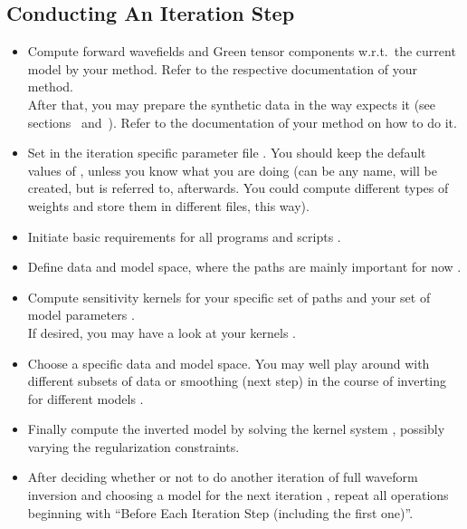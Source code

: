 \subsection*{Conducting An Iteration Step}
%
\begin{itemize}
\item Compute forward wavefields and Green tensor components w.r.t.\ the current model 
by your method. Refer to the respective documentation of your method.\\
After that, you may prepare the synthetic data in the way \ASKI{} expects it (see sections~ 
and~). Refer to the documentation of your method on how to do it.
%
\item Set  in the iteration specific parameter file 
.
You should keep the default values of ,
unless you know what you are doing (can be any name, will be created, but is referred to, afterwards. 
You could compute different types of weights and store them in different files, this way). 
%
\item Initiate basic requirements for all programs and scripts .
%
\item Define data and model space, where the paths are mainly important for now .
%
\item Compute sensitivity kernels for your specific set of paths and your set of model parameters 
  . \\
  If desired, you may have a look at your kernels .
%
\item Choose a specific data and model space. You may well play around with different subsets of data or
smoothing (next step) in the course of inverting for different models .
%
\item Finally compute the inverted model by solving the kernel system ,
  possibly varying the regularization constraints.
%
\item After deciding whether or not to do another iteration of full waveform inversion and choosing a model 
  for the next iteration , repeat all operations beginning 
  with ``Before Each Iteration Step (including the first one)''.
\end{itemize}
%
\newpage
